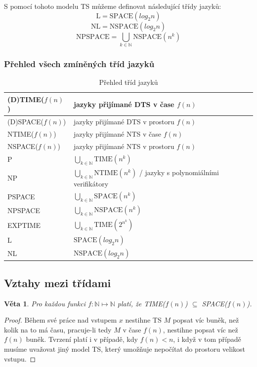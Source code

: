 \documentclass[11pt]{report} %
\newcommand{\N}{\mathbb{N}}
\newtheorem{theorem}{Věta}[section]
\begin{document}
S pomocí tohoto modelu TS můžeme definovat následující třídy jazyků:
$$\text{L} = \text{SPACE}(log_2n)$$
$$\text{NL} = \text{NSPACE}(log_2n)$$
$$\text{NPSPACE} = \bigcup_{k\in\N}\text{NSPACE}(n^k)$$

\subsubsection{Přehled všech zmíněných tříd jazyků}
\begin{table}[H]
	\centering
	\renewcommand{\arraystretch}{1.5}
	\begin{tabular}{|l|l|}
		\hline
		(D)TIME($f(n)$) & jazyky přijímané DTS v čase $f(n)$\\ \hline
		(D)SPACE($f(n)$) & jazyky přijímané DTS v prostoru $f(n)$\\ \hline
		NTIME($f(n)$) & jazyky přijímané NTS v čase $f(n)$\\ \hline
		NSPACE($f(n)$) & jazyky přijímané NTS v prostoru $f(n)$\\ \hline
		P & $\bigcup_{k\in\N} \text{TIME}(n^k)$ \\ \hline
		NP & $\bigcup_{k\in\N}\text{NTIME}(n^k)$ / jazyky s polynomiálními verifikátory \\ \hline
		PSPACE & $\bigcup_{k\in\N} \text{SPACE}(n^k)$ \\ \hline
		NPSPACE & $\bigcup_{k\in\N}\text{NSPACE}(n^k)$ \\ \hline
		EXPTIME & $\bigcup_{k\in\N} \text{TIME}(2^{n^k})$ \\ \hline
		L & $\text{SPACE}(log_2n)$ \\ \hline
		NL & $\text{NSPACE}(log_2n)$ \\ \hline
	\end{tabular}
	\caption{Přehled tříd jazyků}
	\label{complexity_languages}
\end{table}

\subsection{Vztahy mezi třídami}
\begin{theorem}
	Pro každou funkci $f : \N \mapsto \N$ platí, že \emph{TIME($f(n)$) $\subseteq$ SPACE($f(n)$)}.
\end{theorem}
\begin{proof}
	Během své práce nad vstupem $x$ nestihne TS $M$ popsat víc buněk, než kolik na to má času, pracuje-li tedy $M$ v čase $f(n)$, nestihne popsat víc než $f(n)$ buněk. Tvrzení platí i v případě, kdy $f(n) < n$, i když v tom případě musíme uvažovat jiný model TS, který umožňuje nepočítat do prostoru velikost vstupu.
\end{proof}
\end{document}
